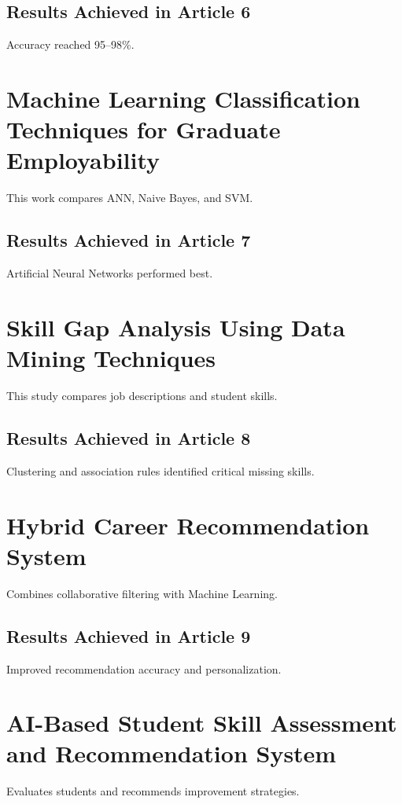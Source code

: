 \documentclass[12pt,a4paper]{report}
\begin{document}
\subsection{Results Achieved in Article 6}
Accuracy reached 95–98\%.

\section{Machine Learning Classification Techniques for Graduate Employability}
\cite{haque2024classification}
\par
This work compares ANN, Naive Bayes, and SVM.

\subsection{Results Achieved in Article 7}
Artificial Neural Networks performed best.

\section{Skill Gap Analysis Using Data Mining Techniques}
\cite{sharma2021skill}
\par
This study compares job descriptions and student skills.

\subsection{Results Achieved in Article 8}
Clustering and association rules identified critical missing skills.

\section{Hybrid Career Recommendation System}
\cite{patel2023hybrid}
\par
Combines collaborative filtering with Machine Learning.

\subsection{Results Achieved in Article 9}
Improved recommendation accuracy and personalization.

\section{AI-Based Student Skill Assessment and Recommendation System}
\cite{verma2024ai}
\par
Evaluates students and recommends improvement strategies.
\end{document}
